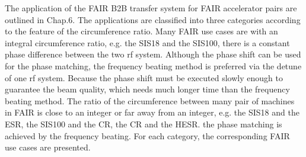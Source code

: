 The application of the FAIR B2B transfer system for FAIR accelerator pairs are outlined in Chap.6. The applications are classified into three categories according to the feature of the circumference ratio. Many FAIR use cases are with an integral circumference ratio, e.g. the SIS18 and the SIS100, there is a constant phase difference between the two rf system. Although the phase shift can be used for the phase matching, the frequency beating method is preferred via the detune of one rf system. Because the phase shift must be executed slowly enough to guarantee the beam quality, which needs much longer time than the frequency beating method. The ratio of the circumference between many pair of machines in FAIR is close to an integer or far away from an integer, e.g. the SIS18 and the ESR, the SIS100 and the CR, the CR and the HESR. the phase matching is achieved by the frequency beating. For each category, the corresponding FAIR use cases are presented. 

%
%
